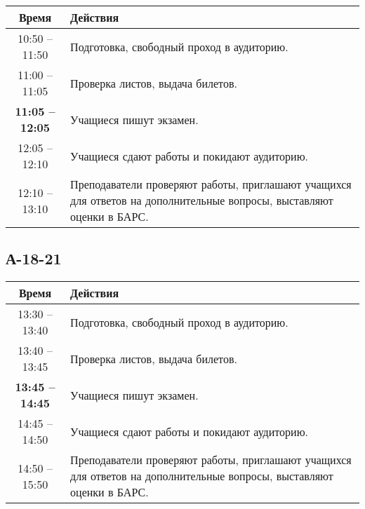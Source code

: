 \documentclass[a4paper,12pt]{article}
\begin{document}
\begin{center}
    \begin{tabular}{|c|p{10cm}|}
        \hline
        Время                   & Действия                                                                                                             \\
        \hline
        10:50 -- 11:50          & Подготовка, свободный проход в аудиторию.                                                                            \\
        \hline
        11:00 -- 11:05          & Проверка листов, выдача билетов.                                                                                     \\
        \hline
        \textbf{11:05 -- 12:05} & Учащиеся пишут экзамен.                                                                                              \\
        \hline
        12:05 -- 12:10          & Учащиеся сдают работы и покидают аудиторию.                                                                          \\
        \hline
        12:10 -- 13:10          & Преподаватели проверяют работы, приглашают учащихся для ответов на дополнительные вопросы, выставляют оценки в БАРС. \\
        \hline
    \end{tabular}
\end{center}

\subsection{А-18-21}

\begin{center}
    \begin{tabular}{|c|p{10cm}|}
        \hline
        Время                   & Действия                                                                                                             \\
        \hline
        13:30 -- 13:40          & Подготовка, свободный проход в аудиторию.                                                                            \\
        \hline
        13:40 -- 13:45          & Проверка листов, выдача билетов.                                                                                     \\
        \hline
        \textbf{13:45 -- 14:45} & Учащиеся пишут экзамен.                                                                                              \\
        \hline
        14:45 -- 14:50          & Учащиеся сдают работы и покидают аудиторию.                                                                          \\
        \hline
        14:50 -- 15:50          & Преподаватели проверяют работы, приглашают учащихся для ответов на дополнительные вопросы, выставляют оценки в БАРС. \\
        \hline
    \end{tabular}
\end{center}
\end{document}
